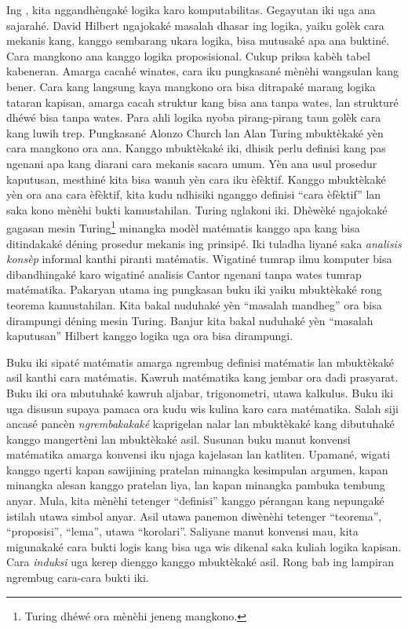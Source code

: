 Ing , kita nggandhèngaké logika karo
komputabilitas. Gegayutan iki uga ana sajarahé. David Hilbert
ngajokaké masalah dhasar ing logika, yaiku golèk cara mekanis kang,
kanggo sembarang ukara logika, bisa mutusaké apa ana buktiné. Cara
mangkono ana kanggo logika proposisional. Cukup priksa kabèh tabel
kabeneran. Amarga cacahé winates, cara iku pungkasané mènèhi wangsulan
kang bener. Cara kang langsung kaya mangkono ora bisa ditrapaké
marang logika tataran kapisan, amarga cacah struktur kang bisa ana
tanpa wates, lan strukturé dhéwé bisa tanpa wates. Para ahli logika
nyoba pirang-pirang taun golèk cara kang luwih trep. Pungkasané
Alonzo Church lan Alan Turing mbuktèkaké yèn cara mangkono ora ana.
Kanggo mbuktèkaké iki, dhisik perlu definisi kang pas ngenani apa
kang diarani cara mekanis sacara umum. Yèn ana usul prosedur
kaputusan, mesthiné kita bisa wanuh yèn cara iku èfèktif. Kanggo
mbuktèkaké yèn ora ana cara èfèktif, kita kudu ndhisiki nganggo
definisi “cara èfèktif” lan saka kono mènèhi bukti kamustahilan.
Turing nglakoni iki. Dhèwèké ngajokaké gagasan mesin
Turing\footnote{Turing dhéwé ora mènèhi jeneng mangkono.} minangka
modèl matématis kanggo apa kang bisa ditindakaké déning prosedur
mekanis ing prinsipé. Iki tuladha liyané saka \emph{analisis
konsèp} informal kanthi piranti matématis. Wigatiné tumrap ilmu
komputer bisa dibandhingaké karo wigatiné analisis Cantor ngenani
tanpa wates tumrap matématika. Pakaryan utama ing pungkasan buku iki
yaiku mbuktèkaké rong teorema kamustahilan. Kita bakal nuduhaké yèn
“masalah mandheg” ora bisa dirampungi déning mesin Turing. Banjur
kita bakal nuduhaké yèn “masalah kaputusan” Hilbert kanggo logika
uga ora bisa dirampungi.

Buku iki sipaté matématis amarga ngrembug definisi matématis lan
mbuktèkaké asil kanthi cara matématis. Kawruh matématika kang jembar
ora dadi prasyarat. Buku iki ora mbutuhaké kawruh aljabar,
trigonometri, utawa kalkulus. Buku iki uga disusun supaya pamaca
ora kudu wis kulina karo cara matématika. Salah siji ancasé pancèn
\emph{ngrembakakaké} kaprigelan nalar lan mbuktèkaké kang dibutuhaké
kanggo mangertèni lan mbuktèkaké asil. Susunan buku manut konvensi
matématika amarga konvensi iku njaga kajelasan lan katliten.
Upamané, wigati kanggo ngerti kapan sawijining pratelan minangka
kesimpulan argumen, kapan minangka alesan kanggo pratelan liya, lan
kapan minangka pambuka tembung anyar. Mula, kita mènèhi tetenger
“definisi” kanggo pérangan kang nepungaké istilah utawa simbol anyar.
Asil utawa panemon diwènèhi tetenger “teorema”, “proposisi”,
“lema”, utawa “korolari”. Saliyane manut konvensi mau, kita
migunakaké cara bukti logis kang bisa uga wis dikenal saka kuliah
logika kapisan. Cara \emph{induksi} uga kerep dienggo kanggo
mbuktèkaké asil. Rong bab ing lampiran ngrembug cara-cara bukti iki.

